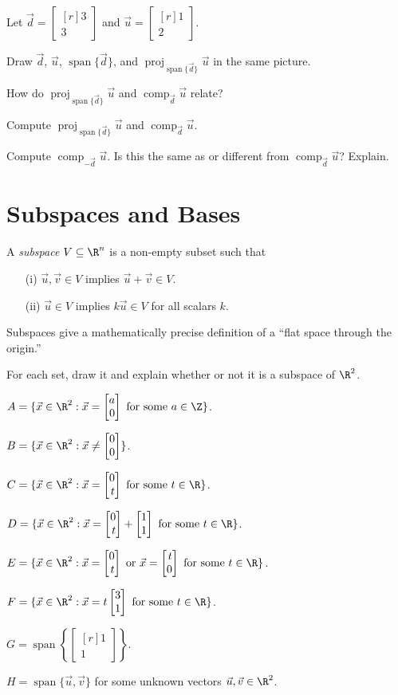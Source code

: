 \documentclass{problemset}
\DeclareMathOperator{\Span}{span}
\DeclareMathOperator{\Comp}{comp}
\DeclareMathOperator{\Proj}{proj}
\newcommand{\mat}[1]{\begin{bmatrix*}[r]#1\end{bmatrix*}}
\begin{document}
	\newpage
	\question
	Let $\vec d=\mat{3\\3}$ and $\vec u=\mat{1\\2}$.
	\begin{parts}
		\item Draw $\vec d$, $\vec u$, $\Span\{\vec d\}$, and $\Proj_{\Span\{\vec d\}}\vec u$
			in the same picture.
		\item How do $\Proj_{\Span\{\vec d\}}\vec u$ and $\Comp_{\vec d}\vec u$ relate?
		\item Compute $\Proj_{\Span\{\vec d\}}\vec u$ and $\Comp_{\vec d}\vec u$.
		\item Compute $\Comp_{-\vec d}\vec u$. Is this the same as or different from 
			$\Comp_{\vec d}\vec u$? Explain.
	\end{parts}


\section*{Subspaces and Bases}
	\vspace{-1em}
	\begin{definition}[Subspace]
		A \emph{subspace} $V\subseteq \R^n$ is a non-empty subset such that
		\begin{enumerate}
			\item[(i)] $\vec u,\vec v\in V$ implies $\vec u+\vec v\in V$.
			\item[(ii)] $\vec u\in V$ implies $k\vec u\in V$ for all scalars $k$.
		\end{enumerate}
	\end{definition}

	Subspaces give a mathematically precise definition of a ``flat space through the origin.''

	\question
	For each set, draw it and explain whether or not it is a subspace of $\R^2$.
	\begin{parts}
		\item $A=\{\vec x\in\R^2:\vec x=\mat{a\\0}\text{ for some }a\in\Z\}$.
		\item $B=\{\vec x\in\R^2:\vec x\neq \mat{0\\0}\}$.
		\item $C=\{\vec x\in\R^2:\vec x=\mat{0\\t}\text{ for some }t\in\R\}$.
		\item $D=\{\vec x\in\R^2:\vec x=\mat{0\\t}+\mat{1\\1}\text{ for some }t\in\R\}$.
		\item $E=\{\vec x\in\R^2:\vec x=\mat{0\\t}\text{ or }\vec x=\mat{t\\0}\text{ for some }t\in\R\}$.
		\item $F=\{\vec x\in\R^2:\vec x=t\mat{3\\1}\text{ for some }t\in\R\}$.
		\item $G=\Span\left\{\mat{1\\1}\right\}$.
		\item $H=\Span\{\vec u,\vec v\}$ for some unknown vectors $\vec u,\vec v\in\R^2$.
	\end{parts}
\end{document}

